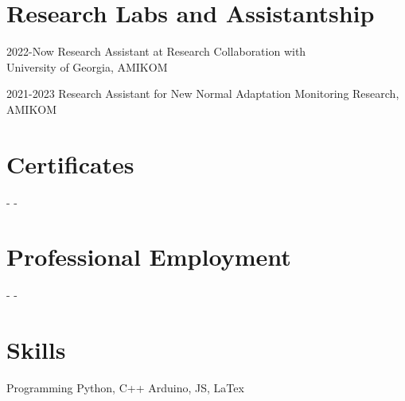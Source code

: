 \documentclass[12pt,letterpaper]{report}
\begin{document}
    \section*{Research Labs and Assistantship}
    \begin{tablist}
        \item[2022-Now] \tab{}Research Assistant at Research Collaboration with \\ University of Georgia, AMIKOM
        \item[2021-2023] \tab{}Research Assistant for New Normal Adaptation Monitoring Research, AMIKOM
    \end{tablist}

    \section*{Certificates}
    \begin{tablist}
        \item[-] \tab{}-
    \end{tablist}

    \section*{Professional Employment}
    \begin{tablist}
        \item[-] \tab{}-
    \end{tablist}

    \section*{Skills}
    \begin{tablist}
        \item[Programming] \tab{}Python, C++ Arduino, JS, LaTex
    \end{tablist}
\end{document}
